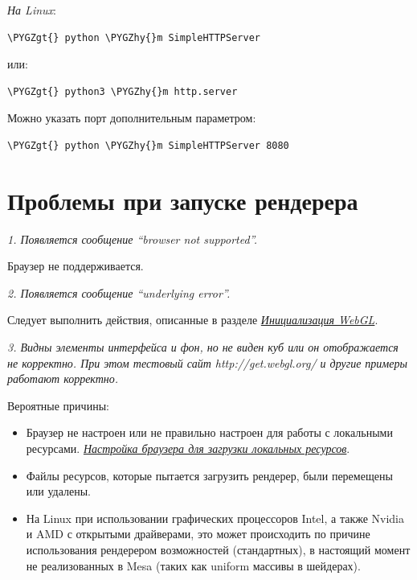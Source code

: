 \documentclass[a4paper,12pt,oneside]{sphinxmanual}
\def\PYGZgt{\char`\>}
\def\PYGZhy{\char`\-}
\begin{document}
\emph{На Linux}:

\begin{Verbatim}[commandchars=\\\{\}]
\PYGZgt{} python \PYGZhy{}m SimpleHTTPServer
\end{Verbatim}

или:

\begin{Verbatim}[commandchars=\\\{\}]
\PYGZgt{} python3 \PYGZhy{}m http.server
\end{Verbatim}

Можно указать порт дополнительным параметром:

\begin{Verbatim}[commandchars=\\\{\}]
\PYGZgt{} python \PYGZhy{}m SimpleHTTPServer 8080
\end{Verbatim}


\section{Проблемы при запуске рендерера}
\label{problems_and_solutions:id6}\label{problems_and_solutions:renderer-not-working}
\emph{1. Появляется сообщение ``browser not supported''.}

Браузер не поддерживается.

\emph{2. Появляется сообщение ``underlying error''.}

Следует выполнить действия, описанные в разделе {\hyperref[problems_and_solutions:webgl-not-working]{\emph{Инициализация WebGL}}}.

\emph{3. Видны элементы интерфейса и фон, но не виден куб или он отображается не корректно. При этом тестовый сайт http://get.webgl.org/ и другие примеры работают корректно.}

Вероятные причины:
\begin{itemize}
\item {} 
Браузер не настроен или не правильно настроен для работы с локальными ресурсами. {\hyperref[problems_and_solutions:browser-for-local-loading]{\emph{Настройка браузера для загрузки локальных ресурсов}}}.

\item {} 
Файлы ресурсов, которые пытается загрузить рендерер, были перемещены или удалены.

\item {} 
На Linux при использовании графических процессоров Intel, а также Nvidia и AMD с открытыми драйверами, это может происходить по причине использования рендерером возможностей (стандартных), в настоящий момент не реализованных в Mesa (таких как uniform массивы в шейдерах).

\end{itemize}
\end{document}

